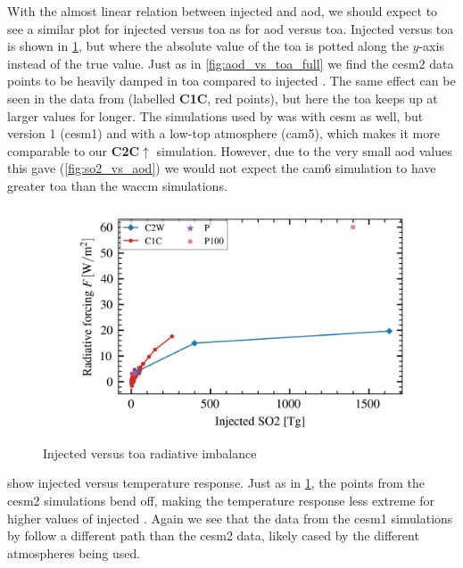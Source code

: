 \documentclass[twocol]{ametsocV5}
\newcommand{\iso}[1][i]{{#1}njected \ce{SO2}}
\begin{document}
With the almost linear relation between injected  and \acrshort{aod}, we should
expect to see a similar plot for \iso{} versus \acrshort{toa} as for \acrshort{aod}
versus \acrshort{toa}. \iso[I] versus \acrshort{toa} is shown in \cref{fig:so2_vs_toa},
but where the absolute value of the \acrshort{toa} is potted along the \( y \)-axis
instead of the true value. Just as in \cref{fig:aod_vs_toa_full} we find the
\acrshort{cesm2} data points to be heavily damped in \acrshort{toa} compared to \iso.
The same effect can be seen in the data from \citet{ottobliesner2016} (labelled
\textbf{C1C}, red points), but here the \acrshort{toa} keeps up at larger values for
longer. The simulations used by \citet{ottobliesner2016} was with \acrshort{cesm} as
well, but version 1 (\acrshort{cesm1}) and with a low-top atmosphere (\acrshort{cam5}),
which makes it more comparable to our \textbf{C2C\(\uparrow\)} simulation. However, due
to the very small \acrshort{aod} values this gave (\cref{fig:so2_vs_aod}) we would not
expect the \acrshort{cam6} simulation to have greater \acrshort{toa} than the
\acrshort{waccm} simulations.

\begin{figure}
  \begin{center}
    \includegraphics[width=0.95\linewidth]{figures/injection_vs_toa.png}
  \end{center}
  \caption{Injected  versus \acrshort{toa} radiative imbalance}%
  \label{fig:so2_vs_toa}
\end{figure}

 show \iso{} versus temperature response. Just as in
\cref{fig:so2_vs_toa}, the points from the \acrshort{cesm2} simulations bend off, making
the temperature response less extreme for higher values of \iso. Again we see that the
data from the \acrshort{cesm1} simulations by \citet{ottobliesner2016} follow a
different path than the \acrshort{cesm2} data, likely cased by the different atmospheres
being used.
\end{document}
